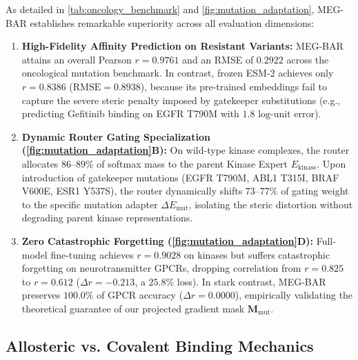 \documentclass{article}
\theoremstyle{definition}
\begin{document}
As detailed in \cref{tab:oncology_benchmark} and \cref{fig:mutation_adaptation}, MEG-BAR establishes remarkable superiority across all evaluation dimensions:
\begin{enumerate}
    \item \textbf{High-Fidelity Affinity Prediction on Resistant Variants:} MEG-BAR attains an overall Pearson $r = 0.9761$ and an RMSE of $0.2922$ across the oncological mutation benchmark. In contrast, frozen ESM-2 achieves only $r = 0.8386$ ($\text{RMSE} = 0.8938$), because its pre-trained embeddings fail to capture the severe steric penalty imposed by gatekeeper substitutions (e.g., predicting Gefitinib binding on EGFR T790M with $1.8\text{ log-unit}$ error).
    \item \textbf{Dynamic Router Gating Specialization (\cref{fig:mutation_adaptation}B):} On wild-type kinase complexes, the router allocates $86\text{--}89\%$ of softmax mass to the parent Kinase Expert $E_{\text{kinase}}$. Upon introduction of gatekeeper mutations (EGFR T790M, ABL1 T315I, BRAF V600E, ESR1 Y537S), the router dynamically shifts $73\text{--}77\%$ of gating weight to the specific mutation adapter $\Delta E_{\text{mut}}$, isolating the steric distortion without degrading parent kinase representations.
    \item \textbf{Zero Catastrophic Forgetting (\cref{fig:mutation_adaptation}D):} Full-model fine-tuning achieves $r = 0.9028$ on kinases but suffers catastrophic forgetting on neurotransmitter GPCRs, dropping correlation from $r = 0.825$ to $r = 0.612$ ($\Delta r = -0.213$, a $25.8\%$ loss). In stark contrast, MEG-BAR preserves $100.0\%$ of GPCR accuracy ($\Delta r = 0.0000$), empirically validating the theoretical guarantee of our projected gradient mask $\mathbf{M}_{\text{mut}}$.
\end{enumerate}

\subsection{Allosteric vs. Covalent Binding Mechanics}
\label{subsec:allosteric_covalent_mechanics}
\end{document}
